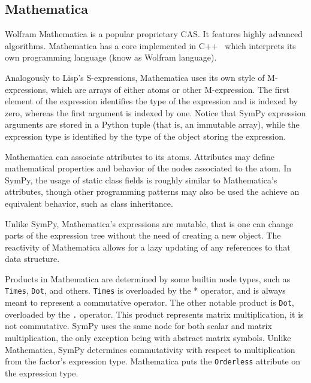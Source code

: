 
\subsection{Mathematica}

Wolfram Mathematica is a popular proprietary CAS.\@
It features highly advanced algorithms.
Mathematica has a core implemented in C++~\cite{Wolfram2016}
which interprets its own programming language (know as Wolfram language).


Analogously to Lisp's S-expressions,
Mathematica uses its own style of M-expressions,
which are arrays of either atoms or other M-expression.
The first element of the expression identifies the type of the expression
and is indexed by zero, whereas the first argument is indexed by one.
Notice that SymPy expression arguments are stored in a Python tuple
(that is, an immutable array),
while the expression type is identified by the type of the object storing the
expression.


Mathematica can associate attributes to its atoms.
Attributes may define mathematical properties and behavior of the nodes
associated to the atom.
In SymPy, the usage of static class fields is roughly similar to Mathematica's
attributes, though other programming patterns may also be used the achieve an
equivalent behavior, such as class inheritance.


Unlike SymPy, Mathematica's expressions are mutable,
that is one can change parts of the expression tree without the need of
creating a new object.
The reactivity of Mathematica allows for a lazy updating of any references
to that data structure.


Products in Mathematica are determined by some builtin node types,
such as \texttt{Times}, \texttt{Dot}, and others.
\texttt{Times} is overloaded by the * operator,
and is always meant to represent a commutative operator.
The other notable product is \texttt{Dot}, overloaded by the \texttt{.} operator.
This product represents matrix multiplication,
it is not commutative.
SymPy uses the same node for both scalar and matrix multiplication,
the only exception being with abstract matrix symbols.
Unlike Mathematica, SymPy determines commutativity with respect to
multiplication from the factor's expression type.
Mathematica puts the \texttt{Orderless} attribute on the expression
type.

